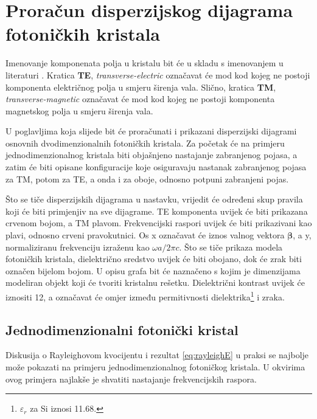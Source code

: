 \documentclass[utf8, seminar, numeric]{fer}
\begin{document}
\chapter{Proračun disperzijskog dijagrama fotoničkih kristala}

Imenovanje komponenata polja u kristalu bit će u skladu s imenovanjem u
literaturi \cite{joannopoulos2011photonic}. Kratica \textbf{TE},
\textit{transverse-electric} označavat će mod kod kojeg ne postoji komponenta
električnog polja u smjeru širenja vala. Slično, kratica \textbf{TM},
\textit{transverse-magnetic} označavat će mod kod kojeg ne postoji komponenta
magnetskog polja u smjeru širenja vala.

U poglavljima koja slijede bit će proračunati i prikazani disperzijski dijagrami
osnovnih dvodimenzionalnih fotoničkih kristala. Za početak će na primjeru
jednodimenzionalnog kristala biti objašnjeno nastajanje zabranjenog pojasa, a
zatim će biti opisane konfiguracije koje osiguravaju nastanak zabranjenog pojasa
za TM, potom za TE, a onda i za oboje, odnosno potpuni zabranjeni pojas.

Što se tiče disperzijskih dijagrama u nastavku, vrijedit će određeni skup pravila
koji će biti primjenjiv na sve dijagrame. TE komponenta uvijek će biti prikazana
crvenom bojom, a TM plavom. Frekvencijski raspori uvijek će biti prikazivani kao
plavi, odnosno crveni pravokutnici. Os x označavat će iznos valnog vektora
${\bm{\beta}}$, a y, normaliziranu frekvenciju izraženu kao
${\omega a/ 2 \pi c}$. Što se tiče prikaza modela fotoničkih kristala,
dielektrično sredstvo uvijek će biti obojano, dok će zrak biti označen bijelom
bojom. U opisu grafa bit će naznačeno s kojim je dimenzijama modeliran objekt
koji će tvoriti kristalnu rešetku. Dielektrični kontrast uvijek će iznositi 12,
a označavat će omjer između permitivnosti dielektrika\footnote{
$\varepsilon_r$ za Si iznosi 11.68.} i zraka.


\section{Jednodimenzionalni fotonički kristal}

Diskusija o Rayleighovom kvocijentu i rezultat \ref{eq:rayleighE} u praksi se
najbolje može pokazati na primjeru jednodimenzionalnog fotoničkog kristala.
U okvirima ovog primjera najlakše je shvatiti nastajanje frekvencijskih raspora.
\end{document}

